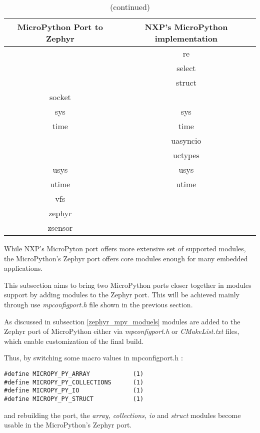 \documentclass[twoside, 12pt]{article}
\begin{document}
\begin{table}[H]
\ContinuedFloat
\caption*{(continued)}
\renewcommand{\arraystretch}{1.2}
\begin{tabular}{|c|c|} \hline
\textbf{MicroPython Port to Zephyr} & \textbf{NXP's MicroPython implementation} \\ \hline
& re \\ \hline
& select \\ \hline
& struct \\ \hline
socket & \\ \hline
sys & sys \\ \hline
time & time \\ \hline
& uasyncio \\ \hline
& uctypes \\ \hline
usys & usys \\ \hline
utime & utime \\ \hline
vfs & \\ \hline
zephyr & \\ \hline
zsensor & \\ \hline
\end{tabular}
\end{table}

While NXP's MicroPyton port offers more extensive set of supported modules, the MicroPython's 
Zephyr port offers core modules enough for many embedded applications.

This subsection aims to bring two MicroPython ports closer together in modules support by 
adding modules to the Zephyr port. This will be achieved mainly through use 
\textit{mpconfigport.h} file shown in the previous section.

As discussed in subsection \ref{zephyr_mpy_moduels} modules are added to the Zephyr port of 
MicroPython either via \textit{mpconfigport.h} or \textit{CMakeList.txt} files, which enable 
customization of the final build.

Thus, by switching some macro values in mpconfigport.h :
\begin{lstlisting}[caption={Extending Zephyr port modules support, Part 1},breaklines=true]
#define MICROPY_PY_ARRAY            (1)
#define MICROPY_PY_COLLECTIONS      (1)
#define MICROPY_PY_IO               (1)
#define MICROPY_PY_STRUCT           (1)
\end{lstlisting}
and rebuilding the port, the \textit{array, collections, io} and \textit{struct} modules 
become usable in the MicroPython's Zephyr port.
\end{document}
